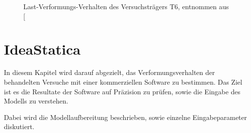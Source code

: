 \documentclass[
  11pt,
  letterpaper,
]{scrreprt}
\begin{document}
\begin{figure}[H]


\caption{\label{fig-durchbiegung_t6}Last-Verformungs-Verhalten des
Versuchsträgers T6, entnommen aus
{[}\citeproc{ref-sigrist_versuche_1993}{5}{]}}

\end{figure}%


\chapter{IdeaStatica}\label{ideastatica}

In diesem Kapitel wird darauf abgezielt, das Verformungsverhalten der
behandelten Versuche mit einer kommerziellen Software zu bestimmen. Das
Ziel ist es die Resultate der Software auf Präzision zu prüfen, sowie
die Eingabe des Modells zu verstehen.

Dabei wird die Modellaufbereitung beschrieben, sowie einzelne
Eingabeparameter diskutiert.

\end{document}
